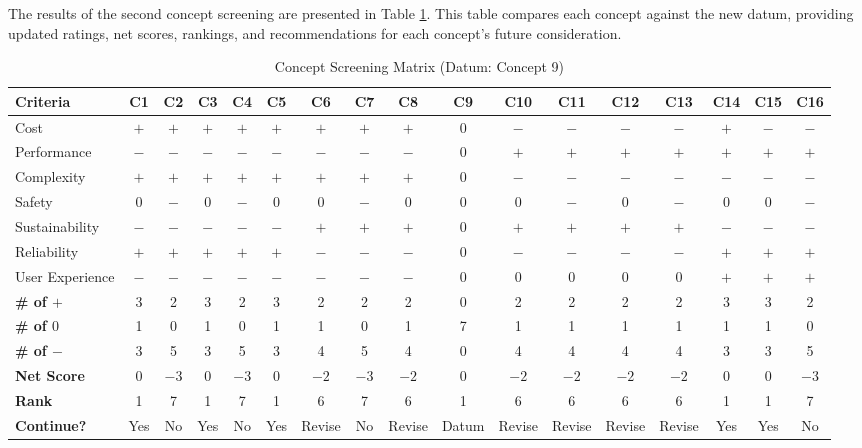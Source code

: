 \documentclass[12pt]{article}
\begin{document}
The results of the second concept screening are presented in Table \ref{tab:concept_screening_2}. This table compares each concept against the new datum, providing updated ratings, net scores, rankings, and recommendations for each concept's future consideration.

\begin{landscape}
\begin{table}[h!]
\centering
\caption{Concept Screening Matrix (Datum: Concept 9)}
\label{tab:concept_screening_2}
\begin{tabular}{l c c c c c c c c c c c c c c c c}
\toprule
\textbf{Criteria} & \textbf{C1} & \textbf{C2} & \textbf{C3} & \textbf{C4} & \textbf{C5} & \textbf{C6} & \textbf{C7} & \textbf{C8} & \textbf{C9} & \textbf{C10} & \textbf{C11} & \textbf{C12} & \textbf{C13} & \textbf{C14} & \textbf{C15} & \textbf{C16} \\
\midrule
Cost              & $+$ & $+$ & $+$ & $+$ & $+$ & $+$ & $+$ & $+$ & 0 & $-$ & $-$ & $-$ & $-$ & $+$ & $-$ & $-$ \\
Performance       & $-$ & $-$ & $-$ & $-$ & $-$ & $-$ & $-$ & $-$ & 0 & $+$ & $+$ & $+$ & $+$ & $+$ & $+$ & $+$ \\
Complexity        & $+$ & $+$ & $+$ & $+$ & $+$ & $+$ & $+$ & $+$ & 0 & $-$ & $-$ & $-$ & $-$ & $-$ & $-$ & $-$ \\
Safety            & 0 & $-$ & 0 & $-$ & 0 & 0 & $-$ & 0 & 0 & 0 & $-$ & 0 & $-$ & 0 & 0 & $-$ \\
Sustainability    & $-$ & $-$ & $-$ & $-$ & $-$ & $+$ & $+$ & $+$ & 0 & $+$ & $+$ & $+$ & $+$ & $-$ & $-$ & $-$ \\
Reliability       & $+$ & $+$ & $+$ & $+$ & $+$ & $-$ & $-$ & $-$ & 0 & $-$ & $-$ & $-$ & $-$ & $+$ & $+$ & $+$ \\
User Experience   & $-$ & $-$ & $-$ & $-$ & $-$ & $-$ & $-$ & $-$ & 0 & 0 & 0 & 0 & 0 & $+$ & $+$ & $+$ \\
\midrule
\textbf{\# of $+$} & 3 & 2 & 3 & 2 & 3 & 2 & 2 & 2 & 0 & 2 & 2 & 2 & 2 & 3 & 3 & 2 \\
\textbf{\# of $0$} & 1 & 0 & 1 & 0 & 1 & 1 & 0 & 1 & 7 & 1 & 1 & 1 & 1 & 1 & 1 & 0 \\
\textbf{\# of $-$} & 3 & 5 & 3 & 5 & 3 & 4 & 5 & 4 & 0 & 4 & 4 & 4 & 4 & 3 & 3 & 5 \\
\textbf{Net Score} & 0 & $-3$ & 0 & $-3$ & 0 & $-2$ & $-3$ & $-2$ & 0 & $-2$ & $-2$ & $-2$ & $-2$ & 0 & 0 & $-3$ \\
\textbf{Rank}      & 1 & 7 & 1 & 7 & 1 & 6 & 7 & 6 & 1 & 6 & 6 & 6 & 6 & 1 & 1 & 7 \\
\textbf{Continue?} & Yes & No & Yes & No & Yes & Revise & No & Revise & Datum & Revise & Revise & Revise & Revise & Yes & Yes & No \\
\bottomrule
\end{tabular}
\end{table}
\end{landscape}
\end{document}
